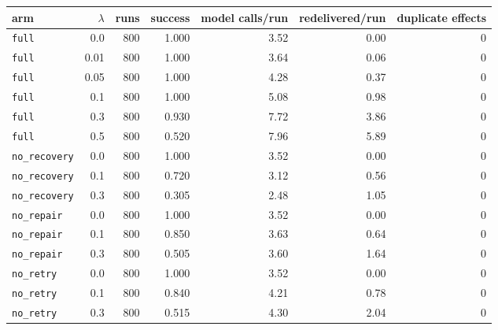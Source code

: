 \begin{tabular}{lrrrrrr}
\toprule
arm & $\lambda$ & runs & success & model calls/run & redelivered/run & duplicate effects \\
\midrule
\texttt{full} & 0.0 & 800 & 1.000 & 3.52 & 0.00 & 0 \\
\texttt{full} & 0.01 & 800 & 1.000 & 3.64 & 0.06 & 0 \\
\texttt{full} & 0.05 & 800 & 1.000 & 4.28 & 0.37 & 0 \\
\texttt{full} & 0.1 & 800 & 1.000 & 5.08 & 0.98 & 0 \\
\texttt{full} & 0.3 & 800 & 0.930 & 7.72 & 3.86 & 0 \\
\texttt{full} & 0.5 & 800 & 0.520 & 7.96 & 5.89 & 0 \\
\texttt{no\_recovery} & 0.0 & 800 & 1.000 & 3.52 & 0.00 & 0 \\
\texttt{no\_recovery} & 0.1 & 800 & 0.720 & 3.12 & 0.56 & 0 \\
\texttt{no\_recovery} & 0.3 & 800 & 0.305 & 2.48 & 1.05 & 0 \\
\texttt{no\_repair} & 0.0 & 800 & 1.000 & 3.52 & 0.00 & 0 \\
\texttt{no\_repair} & 0.1 & 800 & 0.850 & 3.63 & 0.64 & 0 \\
\texttt{no\_repair} & 0.3 & 800 & 0.505 & 3.60 & 1.64 & 0 \\
\texttt{no\_retry} & 0.0 & 800 & 1.000 & 3.52 & 0.00 & 0 \\
\texttt{no\_retry} & 0.1 & 800 & 0.840 & 4.21 & 0.78 & 0 \\
\texttt{no\_retry} & 0.3 & 800 & 0.515 & 4.30 & 2.04 & 0 \\
\bottomrule
\end{tabular}
